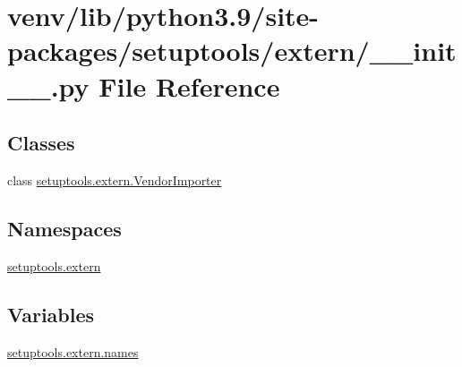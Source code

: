 \hypertarget{venv_2lib_2python3_89_2site-packages_2setuptools_2extern_2____init_____8py}{}\section{venv/lib/python3.9/site-\/packages/setuptools/extern/\+\_\+\+\_\+init\+\_\+\+\_\+.py File Reference}
\label{venv_2lib_2python3_89_2site-packages_2setuptools_2extern_2____init_____8py}
\subsection*{Classes}
\begin{DoxyCompactItemize}
\item 
class \hyperlink{classsetuptools_1_1extern_1_1VendorImporter}{setuptools.\+extern.\+Vendor\+Importer}
\end{DoxyCompactItemize}
\subsection*{Namespaces}
\begin{DoxyCompactItemize}
\item 
 \hyperlink{namespacesetuptools_1_1extern}{setuptools.\+extern}
\end{DoxyCompactItemize}
\subsection*{Variables}
\begin{DoxyCompactItemize}
\item 
\hyperlink{namespacesetuptools_1_1extern_abd24b5ae6a41d81c24ba1e0bc4404a5b}{setuptools.\+extern.\+names}
\end{DoxyCompactItemize}
